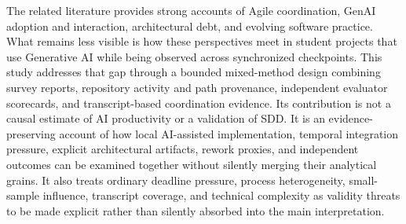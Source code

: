The related literature provides strong accounts of Agile coordination, GenAI
adoption and interaction, architectural debt, and evolving software practice.
What remains less visible is how these perspectives meet in student projects
that use Generative AI while being observed across synchronized checkpoints.
This study addresses that gap through a bounded mixed-method design combining
survey reports, repository activity and path provenance, independent evaluator
scorecards, and transcript-based coordination evidence. Its contribution is
not a causal estimate of AI productivity or a validation of SDD. It is an
evidence-preserving account of how local AI-assisted implementation, temporal
integration pressure, explicit architectural artifacts, rework proxies, and
independent outcomes can be examined together without silently merging their
analytical grains. It also treats ordinary deadline pressure, process
heterogeneity, small-sample influence, transcript coverage, and technical
complexity as validity threats to be made explicit rather than silently
absorbed into the main interpretation.
